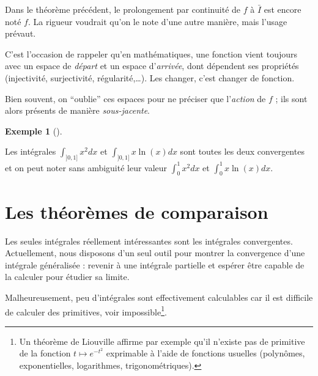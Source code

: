 \documentclass[
  french,
  letterpaper,
  DIV=11,
  numbers=noendperiod]{scrreprt}
\theoremstyle{plain}
\theoremstyle{definition}
\theoremstyle{plain}
\theoremstyle{plain}
\theoremstyle{definition}
\theoremstyle{definition}
\newtheorem{example}{Exemple}[chapter]
\theoremstyle{plain}
\theoremstyle{remark}
\newcounter{quartocalloutnteno}
\newcommand{\quartocalloutnte}[1]{\refstepcounter{quartocalloutnteno}\label{#1}}
\begin{document}
\begin{tcolorbox}[enhanced jigsaw, arc=.35mm, bottomrule=.15mm, bottomtitle=1mm, breakable, colback=white, colbacktitle=quarto-callout-note-color!10!white, colframe=quarto-callout-note-color-frame, coltitle=black, left=2mm, leftrule=.75mm, opacityback=0, opacitybacktitle=0.6, rightrule=.15mm, title=\textcolor{quarto-callout-note-color}{\faInfo}\hspace{0.5em}{Note \ref*{nte-prolongement}}, titlerule=0mm, toprule=.15mm, toptitle=1mm]

\quartocalloutnte{nte-prolongement} 

Dans le théorème précédent, le prolongement par continuité de \(f\) à
\(\bar{I}\) est encore noté \(f\). La rigueur voudrait qu'on le note
d'une autre manière, mais l'usage prévaut.

C'est l'occasion de rappeler qu'en mathématiques, une fonction vient
toujours avec un espace de \emph{départ} et un espace d'\emph{arrivée},
dont dépendent ses propriétés (injectivité, surjectivité,
régularité,\ldots). Les changer, c'est changer de fonction.

Bien souvent, on ``oublie'' ces espaces pour ne préciser que
l'\emph{action} de \(f\) ; ils sont alors présents de manière
\emph{sous-jacente}.

\end{tcolorbox}

\begin{example}[]\protect\hypertarget{exm-faussement-generalisee}{}\label{exm-faussement-generalisee}

Les intégrales \(\int_{]0,1]}x^{2}dx\) et \(\int_{]0,1]}x\ln(x)dx\) sont
toutes les deux convergentes et on peut noter sans ambiguité leur valeur
\(\int_{0}^{1}x^{2}dx\) et \(\int_{0}^{1}x\ln(x)dx\).

\end{example}

\section{Les théorèmes de comparaison}\label{sec-01-comparaison}

Les seules intégrales réellement intéressantes sont les intégrales
convergentes. Actuellement, nous disposons d'un seul outil pour montrer
la convergence d'une intégrale généralisée : revenir à une intégrale
partielle et espérer être capable de la calculer pour étudier sa limite.

Malheureusement, peu d'intégrales sont effectivement calculables car il
est difficile de calculer des primitives, voir impossible\footnote{Un
  théorème de Liouville affirme par exemple qu'il n'existe pas de
  primitive de la fonction \(t \mapsto
  e^{-t^{2}}\) exprimable à l'aide de fonctions usuelles (polynômes,
  exponentielles, logarithmes, trigonométriques).}.
\end{document}
